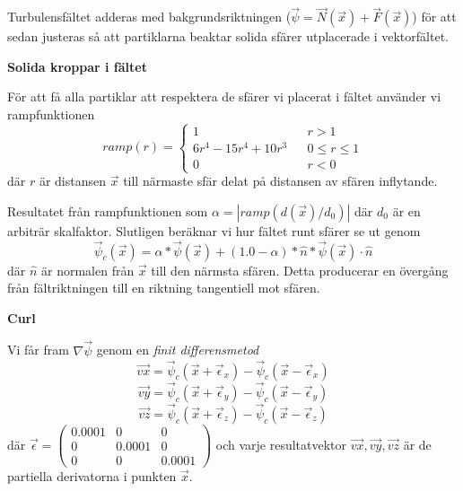 \documentclass[a4paper]{article}
\begin{document}
\begin{multicols}{2}
Turbulensfältet adderas med bakgrundsriktningen ($\vec{\psi} = \vec{N}(\vec{x}) + \vec{F}(\vec{x})$) för att sedan justeras så att partiklarna beaktar solida sfärer utplacerade i vektorfältet. 

\textbf{Solida kroppar i fältet}

För att få alla partiklar att respektera de sfärer vi placerat i fältet använder vi rampfunktionen
\begin{equation}
ramp(r) = \left\{\begin{matrix}
1  && r > 1
\\
6r^4 - 15r^4 + 10r^3 && 0 \le r \le 1
\\ 
0  && r < 0
\end{matrix}\right.
\end{equation}
där $r$ är distansen $\vec{x}$ till närmaste sfär delat på distansen av sfären inflytande. 

Resultatet från rampfunktionen som $\alpha = | ramp(d(\vec{x})/d_0) |$ där $d_0$  är en arbiträr skalfaktor. Slutligen beräknar vi hur fältet runt sfärer se ut genom 
\begin{equation}
\vec{\psi}_c(\vec{x}) = \alpha * \vec{\psi}(\vec{x}) + (1.0 - \alpha) * \hat{n} * \vec{\psi}(\vec{x}) \cdot \hat{n}
\end{equation}
där $\hat{n}$ är normalen från $\vec{x}$ till den närmsta sfären. Detta producerar en övergång från fältriktningen till en riktning tangentiell mot sfären.

\textbf{Curl}

Vi får fram $ \nabla \vec{\psi}$ genom en \textit{finit differensmetod}
\begin{equation}
\vec{vx} = \vec{\psi}_c(\vec{x} + \vec{\epsilon}_x  ) - \vec{\psi}_c(\vec{x} - \vec{\epsilon}_x  )
\end{equation}
\begin{equation}
\vec{vy} = \vec{\psi}_c(\vec{x} + \vec{\epsilon}_y  ) - \vec{\psi}_c(\vec{x} - \vec{\epsilon}_y  )
\end{equation}
\begin{equation}
\vec{vz} = \vec{\psi}_c(\vec{x} + \vec{\epsilon}_z  ) - \vec{\psi}_c(\vec{x} - \vec{\epsilon}_z  )
\end{equation}
där $\vec{\epsilon} = \begin{pmatrix}
0.0001 & 0 & 0\\ 
0 & 0.0001 & 0\\ 
0 & 0 & 0.0001
\end{pmatrix}$ och varje resultatvektor $\vec{vx},\vec{vy},\vec{vz}$ är de partiella derivatorna i punkten $\vec{x}$.


\end{multicols}
\end{document}
